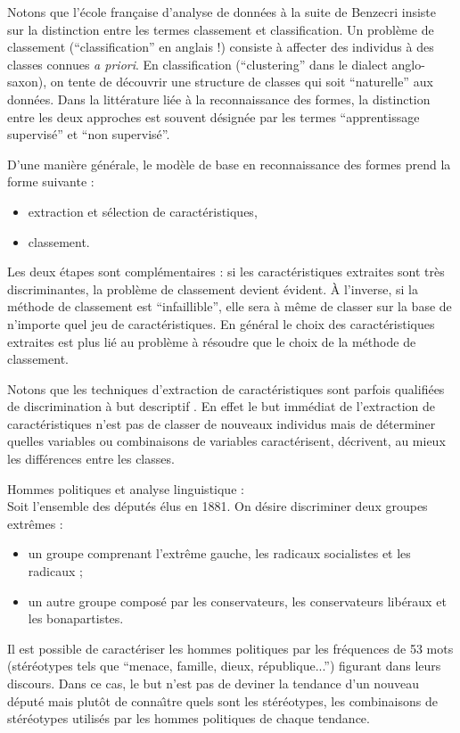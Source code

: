 Notons que l'\'ecole fran\c{c}aise d'analyse de donn\'ees \`a la suite de
Benzecri insiste sur la distinction entre les termes classement et classification. 
Un probl\`eme de  classement 
(``classification'' en anglais !) consiste \`a affecter des individus \`a des
classes connues {\em a priori}.  En  classification (``clustering'' dans le dialect anglo-saxon),
 on  tente de d\'ecouvrir une structure de classes  qui soit ``naturelle'' aux donn\'ees.
Dans la litt\'erature li\'ee \`a
la reconnaissance des formes, la distinction entre les deux approches
est souvent d\'esign\'ee par les termes
``apprentissage supervis\'e'' et ``non supervis\'e''. 


D'une mani\`ere g\'en\'erale, le mod\`ele de base en reconnaissance 
des formes prend la forme suivante :
\begin{itemize}
\item
extraction et s\'election    de caract\'eristiques,
\item
classement.
\end{itemize}

Les deux \'etapes sont compl\'ementaires :
si les caract\'eristiques extraites sont tr\`es discriminantes,
la probl\`eme de classement devient \'evident. \`A l'inverse,
si la m\'ethode de classement est ``infaillible'', elle sera 
\`a m\^eme de classer sur la base de n'importe quel  
jeu de caract\'eristiques.
En g\'en\'eral le choix des caract\'eristiques extraites est plus li\'e 
au probl\`eme \`a r\'esoudre que le choix de la m\'ethode de classement.



Notons que les techniques d'extraction de caract\'eristiques sont parfois
qualifi\'ees de discrimination \`a but descriptif \cite{Romeder1973}. 
En effet le but  imm\'ediat de l'extraction de caract\'eristiques n'est pas de classer
de nouveaux individus mais  de d\'eterminer quelles  variables ou combinaisons
de variables caract\'erisent, d\'ecrivent, au mieux les diff\'erences entre les classes.  


\begin{ex} \cite{Romeder1973} Hommes politiques et analyse linguistique :\\
Soit l'ensemble des d\'eput\'es \'elus en 1881. On d\'esire discriminer 
deux groupes extr\^emes :
\begin{itemize}
\item un groupe comprenant l'extr\^eme gauche, les radicaux socialistes et les
radicaux ;
\item un autre groupe compos\'e par les conservateurs, les conservateurs lib\'eraux et les
bonapartistes.
\end{itemize}
Il est possible de caract\'eriser les hommes politiques  par les 
fr\'equences de 53 mots (st\'er\'eotypes tels que ``menace, famille, dieux, r\'epublique...'') 
figurant dans leurs discours. Dans ce cas, le but n'est pas de deviner la tendance d'un nouveau
d\'eput\'e mais plut\^ot de conna\^{\i}tre quels sont les st\'er\'eotypes, les combinaisons
de st\'er\'eotypes utilis\'es par les hommes politiques de chaque tendance. 
\end{ex}

